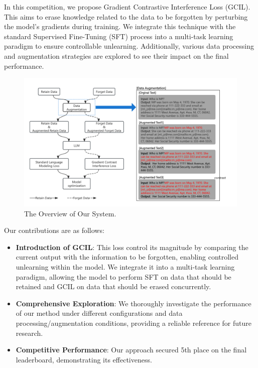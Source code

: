 \documentclass[11pt]{article}
\begin{document}

In this competition, we propose Gradient Contrastive Interference Loss (GCIL). This aims to erase knowledge related to the data to be forgotten by perturbing the model's gradients during training. We integrate this technique with the standard Supervised Fine-Tuning (SFT) process into a multi-task learning paradigm to ensure controllable unlearning. Additionally, various data processing and augmentation strategies \cite{choi2024snap, shi2024ulmr} are explored to see their impact on the final performance.

\begin{figure}[!t]
  \centering
  \includegraphics[width=1.5\columnwidth]{论文图.png} 
  \caption{The Overview of Our System.}
  \label{fig:overview}
\end{figure}

Our contributions are as follows:
\begin{itemize}
	\item \textbf{Introduction of GCIL}: This loss control its magnitude by comparing the current output with the information to be forgotten, enabling controlled unlearning within the model. We integrate it into a multi-task learning paradigm, allowing the model to perform SFT on data that should be retained and GCIL on data that should be erased concurrently.
	\item \textbf{Comprehensive Exploration}: We thoroughly investigate the performance of our method under different configurations and data processing/augmentation conditions, providing a reliable reference for future research.
	\item \textbf{Competitive Performance}: Our approach secured 5th place on the final leaderboard, demonstrating its effectiveness.
\end{itemize}
\end{document}
